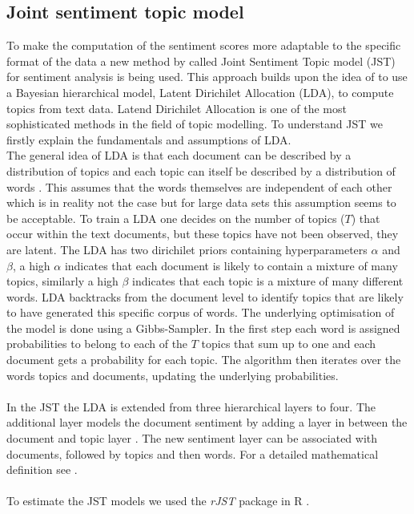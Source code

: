\subsection{Joint sentiment topic model}\label{JST}
To make the computation of the sentiment scores more adaptable to the specific format of the data a new method by \citet{lin2009joint} called Joint Sentiment Topic model (JST) for sentiment analysis is being used. This approach builds upon the idea of \citet{blei2003latent} to use a Bayesian hierarchical model, Latent Dirichilet Allocation (LDA), to compute topics from text data. Latend Dirichilet Allocation is one of the most sophisticated methods in the field of topic modelling. To understand JST we firstly explain the fundamentals and assumptions of LDA. \\ 

The general idea of LDA is that each document can be described by a distribution of topics and each topic can itself be described by a distribution of words \citep{blei2003latent}. This assumes that the words themselves are independent of each other which is in reality not the case but for large data sets this assumption seems to be acceptable. To train a LDA one decides on the number of topics ($T$) that occur within the text documents, but these topics have not been observed, they are latent. The LDA has two dirichilet priors containing hyperparameters $\alpha$ and $\beta$, a high $\alpha$ indicates that each document is likely to contain a mixture of many topics, similarly a high $\beta$ indicates that each topic is a mixture of many different words. LDA backtracks from the document level to identify topics that are likely to have generated this specific corpus of words. The underlying optimisation of the model is done using a Gibbs-Sampler. In the first step each word is assigned probabilities to belong to each of the $T$ topics that sum up to one and each document gets a probability for each topic. The algorithm then iterates over the words topics and documents, updating the underlying probabilities. \\ \\
In the JST the LDA is extended from three hierarchical layers to four. The additional layer models the document sentiment by adding a layer in between the document and topic layer \citep{lin2009joint}. The new sentiment layer can be associated with documents, followed by topics and then words. For a detailed mathematical definition see \citet{lin2009joint}. \\ \\
To estimate the JST models we used the \textit{rJST} package in R \citep{rJST}. 

